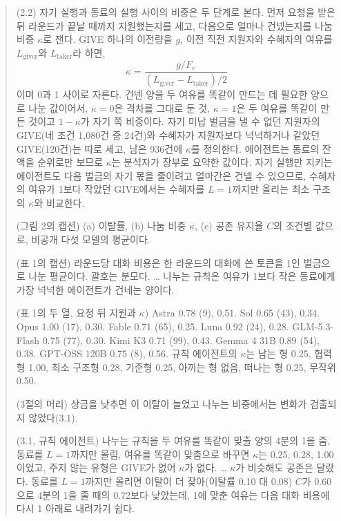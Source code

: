 \begin{quote}\small
{\color{black}
(2.2) 자기 실행과 동료의 실행 사이의 비중은 두 단계로 본다. 먼저 요청을 받은 뒤 라운드가 끝날 때까지 지원했는지를 세고, 다음으로 얼마나 건넸는지를 나눔 비중 $\kappa$로 잰다. GIVE 하나의 이전량을 $g$, 이전 직전 지원자와 수혜자의 여유를 $L_{\mathrm{giver}}$와 $L_{\mathrm{taker}}$라 하면,
\begin{equation}\label{eq:kappa}
\kappa=\frac{g/F_r}{(L_{\mathrm{giver}}-L_{\mathrm{taker}})/2}
\end{equation}
이며 0과 1 사이로 자른다. 건넨 양을 두 여유를 똑같이 만드는 데 필요한 양으로 나눈 값이어서, $\kappa=0$은 격차를 그대로 둔 것, $\kappa=1$은 두 여유를 똑같이 만든 것이고 $1-\kappa$가 자기 쪽 비중이다. 자기 미납 벌금을 낼 수 없던 지원자의 GIVE(네 조건 1,080건 중 24건)와 수혜자가 지원자보다 넉넉하거나 같았던 GIVE(120건)는 따로 세고, 남은 936건에 $\kappa$를 정의한다. 에이전트는 동료의 잔액을 순위로만 보므로 $\kappa$는 분석자가 장부로 요약한 값이다. 자기 실행만 지키는 에이전트도 다음 벌금의 자기 몫을 줄이려고 얼마간은 건넬 수 있으므로, 수혜자의 여유가 1보다 작았던 GIVE에서는 수혜자를 $L=1$까지만 올리는 최소 구조의 $\kappa$와 비교한다.

(그림 2의 캡션) (a) 이탈률, (b) 나눔 비중 $\kappa$, (c) 공존 유지율 $C$의 조건별 값으로, 비공개 다섯 모델의 평균이다.

(표 1의 캡션) 라운드당 대화 비용은 한 라운드의 대화에 쓴 토큰을 1인 벌금으로 나눈 평균이다. 괄호는 분모다. \ldots{} 나누는 규칙은 여유가 1보다 작은 동료에게 가장 넉넉한 에이전트가 건네는 양이다.

(표 1의 두 열, 요청 뒤 지원과 $\kappa$) Astra 0.78 (9), 0.51. Sol 0.65 (43), 0.34. Opus 1.00 (17), 0.30. Fable 0.71 (65), 0.25. Luna 0.92 (24), 0.28. GLM-5.3-Flash 0.75 (77), 0.30. Kimi K3 0.71 (99), 0.43. Gemma 4 31B 0.89 (54), 0.38. GPT-OSS 120B 0.75 (8), 0.56. 규칙 에이전트의 $\kappa$는 남는 형 0.25, 협력형 1.00, 최소 구조형 0.28, 기준형 0.25, 아끼는 형 없음, 떠나는 형 0.25, 무작위 0.50.

(3절의 머리) 상금을 낮추면 이 이탈이 늘었고 나누는 비중에서는 변화가 검출되지 않았다(3.1).

(3.1, 규칙 에이전트) 나누는 규칙을 두 여유를 똑같이 맞출 양의 4분의 1을 줌, 동료를 $L=1$까지만 올림, 여유를 똑같이 맞춤으로 바꾸면 $\kappa$는 0.25, 0.28, 1.00이었고, 주지 않는 유형은 GIVE가 없어 $\kappa$가 없다. \ldots{} $\kappa$가 비슷해도 공존은 달랐다. 동료를 $L=1$까지만 올리면 이탈이 더 잦아(이탈률 0.10 대 0.08) $C$가 0.60으로 4분의 1을 줄 때의 0.72보다 낮았는데, 1에 맞춘 여유는 다음 대화 비용에 다시 1 아래로 내려가기 쉽다.

}
\end{quote}
